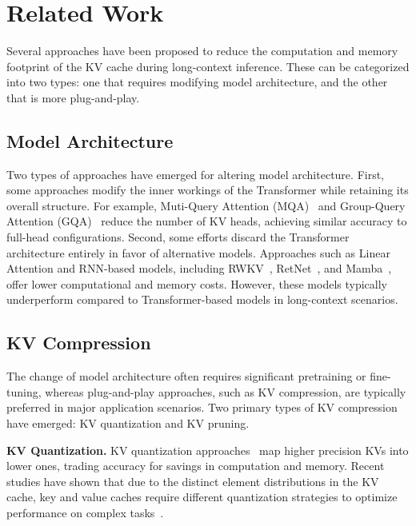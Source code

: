 \section{Related Work}
\label{sec-related}

Several approaches have been proposed to reduce the computation and memory footprint of the KV cache during long-context inference. These can be categorized into two types: one that requires modifying model architecture, and the other that is more plug-and-play.

\subsection{Model Architecture} 

Two types of approaches have emerged for altering model architecture. First, some approaches modify the inner workings of the Transformer while retaining its overall structure. For example, Muti-Query Attention (MQA)~\cite{shazeer2019fast} and Group-Query Attention (GQA)~\cite{ainslie2023gqa} reduce the number of KV heads, achieving similar accuracy to full-head configurations. Second, some efforts discard the Transformer architecture entirely in favor of alternative models. Approaches such as Linear Attention and RNN-based models, including RWKV~\cite{peng2023rwkvreinventingrnnstransformer}, RetNet~\cite{sun2023retentivenetworksuccessortransformer}, and Mamba~\cite{gu2024mambalineartimesequencemodeling}, offer lower computational and memory costs. However, these models typically underperform compared to Transformer-based models in long-context scenarios. 

\subsection{KV Compression}

The change of model architecture often requires significant pretraining or fine-tuning, whereas plug-and-play approaches, such as KV compression, are typically preferred in major application scenarios. Two primary types of KV compression have emerged: KV quantization and KV pruning.

\textbf{KV Quantization.} KV quantization approaches~\cite{xiao2024smoothquantaccurateefficientposttraining, yao2022zeroquantefficientaffordableposttraining, dettmers2022gpt3} map higher precision KVs into lower ones, trading accuracy for savings in computation and memory. Recent studies have shown that due to the distinct element distributions in the KV cache, key and value caches require different quantization strategies to optimize performance on complex tasks~\cite{kivi}.

